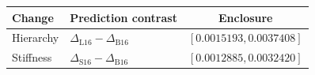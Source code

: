 \begin{tabular}{llc}\toprule
Change & Prediction contrast & Enclosure\\\midrule
Hierarchy & $\Delta_{\mathrm{L16}}-\Delta_{\mathrm{B16}}$ & $[0.0015193, 0.0037408]$ \\
Stiffness & $\Delta_{\mathrm{S16}}-\Delta_{\mathrm{B16}}$ & $[0.0012885, 0.0032420]$ \\
\bottomrule\end{tabular}
